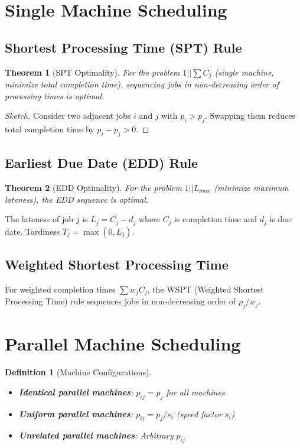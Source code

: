 \documentclass[a4paper, 11pt]{article}
\newtheorem{definition}{Definition}[section]
\newtheorem{theorem}{Theorem}[section]
\begin{document}
\section{Single Machine Scheduling}

\subsection{Shortest Processing Time (SPT) Rule}

\begin{theorem}[SPT Optimality]
For the problem $1||\sum C_j$ (single machine, minimize total completion time), sequencing
jobs in non-decreasing order of processing times is optimal.
\end{theorem}

\begin{proof}[Sketch]
Consider two adjacent jobs $i$ and $j$ with $p_i > p_j$. Swapping them reduces total
completion time by $p_i - p_j > 0$.
\end{proof}

\subsection{Earliest Due Date (EDD) Rule}

\begin{theorem}[EDD Optimality]
For the problem $1||L_{max}$ (minimize maximum lateness), the EDD sequence is optimal.
\end{theorem}

The lateness of job $j$ is $L_j = C_j - d_j$ where $C_j$ is completion time and $d_j$ is
due date. Tardiness $T_j = \max(0, L_j)$.

\subsection{Weighted Shortest Processing Time}

For weighted completion times $\sum w_j C_j$, the WSPT (Weighted Shortest Processing Time)
rule sequences jobs in non-decreasing order of $p_j/w_j$.

\section{Parallel Machine Scheduling}

\begin{definition}[Machine Configurations]
\begin{itemize}
\item \textbf{Identical parallel machines}: $p_{ij} = p_j$ for all machines
\item \textbf{Uniform parallel machines}: $p_{ij} = p_j / s_i$ (speed factor $s_i$)
\item \textbf{Unrelated parallel machines}: Arbitrary $p_{ij}$
\end{itemize}
\end{definition}
\end{document}
